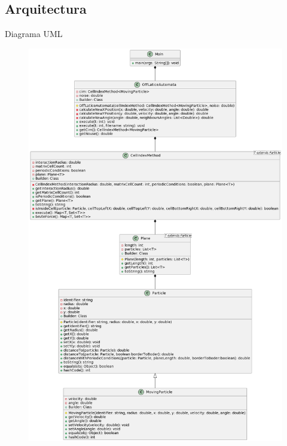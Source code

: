 \documentclass{beamer}
\begin{document}
    \subsection{Arquitectura}
    \begin{frame}{Diagrama UML}
        \begin{figure}[htbp]
            \centering
            \includegraphics[height=0.69\textheight]{./architecture}
            \label{fig:architecture}
        \end{figure}
    \end{frame}
\end{document}
